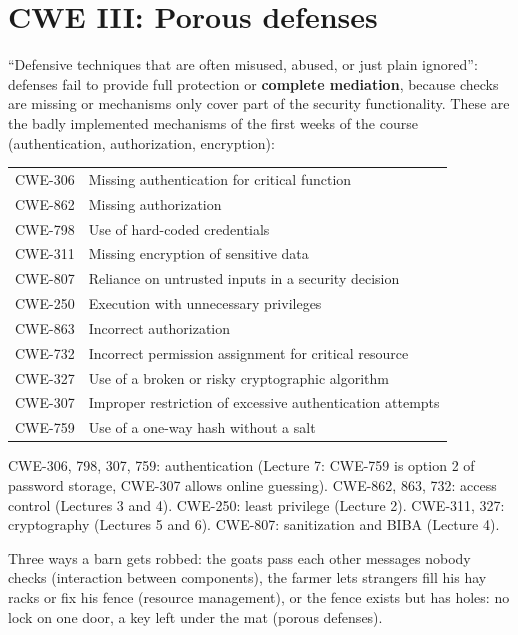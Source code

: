 \section{CWE III: Porous defenses}

\begin{defnbox}[title={Porous defenses}]
``Defensive techniques that are often misused, abused, or just plain ignored'': defenses fail to
provide full protection or \textbf{complete mediation}, because checks are missing or mechanisms
only cover part of the security functionality. These are the badly implemented mechanisms of the
first weeks of the course (authentication, authorization, encryption):
\begin{center}
\small
\begin{tabularx}{\linewidth}{l|X}
CWE-306 & Missing authentication for critical function \\
CWE-862 & Missing authorization \\
CWE-798 & Use of hard-coded credentials \\
CWE-311 & Missing encryption of sensitive data \\
CWE-807 & Reliance on untrusted inputs in a security decision \\
CWE-250 & Execution with unnecessary privileges \\
CWE-863 & Incorrect authorization \\
CWE-732 & Incorrect permission assignment for critical resource \\
CWE-327 & Use of a broken or risky cryptographic algorithm \\
CWE-307 & Improper restriction of excessive authentication attempts \\
CWE-759 & Use of a one-way hash without a salt
\end{tabularx}
\end{center}
\end{defnbox}

\begin{rembox}[title=Each porous defense is a lecture]
CWE-306, 798, 307, 759: authentication (Lecture 7: CWE-759 is option 2 of password storage, CWE-307
allows online guessing). CWE-862, 863, 732: access control (Lectures 3 and 4). CWE-250: least
privilege (Lecture 2). CWE-311, 327: cryptography (Lectures 5 and 6). CWE-807: sanitization and
BIBA (Lecture 4).
\end{rembox}

\begin{goatbox}
Three ways a barn gets robbed: the goats pass each other messages nobody checks (interaction
between components), the farmer lets strangers fill his hay racks or fix his fence (resource
management), or the fence exists but has holes: no lock on one door, a key left under the mat
(porous defenses).
\end{goatbox}

